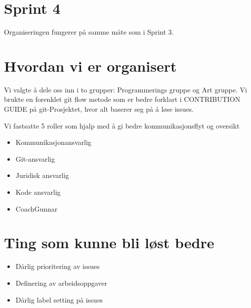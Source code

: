 \documentclass[11pt]{article}
\begin{document}
\section*{Sprint 4}
Organiseringen fungerer på samme måte som i Sprint 3. 

\section*{Hvordan vi er organisert}

Vi valgte å dele oss inn i to grupper: Programmerings gruppe og Art gruppe.
Vi brukte en forenklet git flow metode som er bedre forklart i CONTRIBUTION
GUIDE på git-Prosjektet, hvor alt baserer seg på å løse issues.

Vi fastsatte 5 roller som hjalp med å gi bedre kommunikasjonsflyt og oversikt 
\begin{itemize}
\item Kommunikasjonansvarlig
\item Git-ansvarlig
\item Juridisk ansvarlig
\item Kode ansvarlig
\item CoachGunnar
\end{itemize}

\section*{Ting som kunne bli løst bedre}
\begin{itemize}
\item Dårlig prioritering av issues
\item Definering av arbeidsoppgaver
\item Dårlig label setting på issues
\end{itemize}
\vspace{1em}
\end{document}

